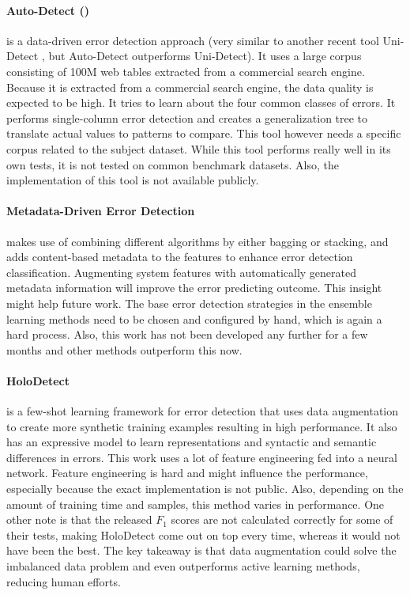 \paragraph{Auto-Detect (\cite{Wang2019-jg})} is a data-driven error detection approach (very similar to another recent tool Uni-Detect \cite{Huang2018-er}, but Auto-Detect outperforms Uni-Detect). It uses a large corpus consisting of 100M web tables extracted from a commercial search engine. Because it is extracted from a commercial search engine, the data quality is expected to be high. It tries to learn about the four common classes of errors. It performs single-column error detection and creates a generalization tree to translate actual values to patterns to compare. This tool however needs a specific corpus related to the subject dataset. While this tool performs really well in its own tests, it is not tested on common benchmark datasets. Also, the implementation of this tool is not available publicly.

\paragraph{Metadata-Driven Error Detection \cite{Visengeriyeva2018-qz}} makes use of combining different algorithms by either bagging or stacking, and adds content-based metadata to the features to enhance error detection classification. Augmenting system features with automatically generated metadata information will improve the error predicting outcome. This insight might help future work. The base error detection strategies in the ensemble learning methods need to be chosen and configured by hand, which is again a hard process. Also, this work has not been developed any further for a few months and other methods outperform this now.

\paragraph{HoloDetect \cite{Heidari2019-ox}} is a few-shot learning framework for error detection that uses data augmentation to create more synthetic training examples resulting in high performance. It also has an expressive model to learn representations and syntactic and semantic differences in errors. This work uses a lot of feature engineering fed into a neural network. Feature engineering is hard and might influence the performance, especially because the exact implementation is not public. Also, depending on the amount of training time and samples, this method varies in performance. One other note is that the released $F_1$ scores are not calculated correctly for some of their tests, making HoloDetect come out on top every time, whereas it would not have been the best. The key takeaway is that data augmentation could solve the imbalanced data problem and even outperforms active learning methods, reducing human efforts. 

